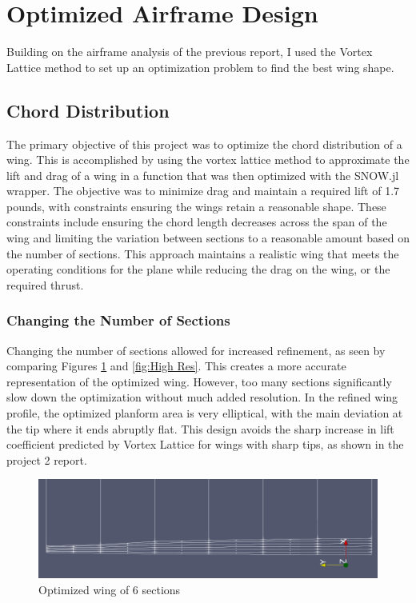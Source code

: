 \documentclass{article}
\begin{document}
\section{Optimized Airframe Design}
Building on the airframe analysis of the previous report, I used the Vortex Lattice method to set up an optimization problem to find the best wing shape.

\subsection{Chord Distribution}
The primary objective of this project was to optimize the chord distribution of a wing. This is accomplished by using the vortex lattice method to approximate the lift and drag of a wing in a function that was then optimized with the SNOW.jl wrapper. The objective was to minimize drag and maintain a required lift of 1.7 pounds, with constraints ensuring the wings retain a reasonable shape. These constraints include ensuring the chord length decreases across the span of the wing and limiting the variation between sections to a reasonable amount based on the number of sections. This approach maintains a realistic wing that meets the operating conditions for the plane while reducing the drag on the wing, or the required thrust.

\subsubsection{Changing the Number of Sections}
Changing the number of sections allowed for increased refinement, as seen by comparing Figures \ref{fig:Low Res} and \ref{fig:High Res}. This creates a more accurate representation of the optimized wing. However, too many sections significantly slow down the optimization without much added resolution. In the refined wing profile, the optimized planform area is very elliptical, with the main deviation at the tip where it ends abruptly flat. This design avoids the sharp increase in lift coefficient predicted by Vortex Lattice for wings with sharp tips, as shown in the project 2 report.

\begin{figure}[h]
\centering
\includegraphics[width=\textwidth]{LOW RES FOCUSED.png}
\caption{Optimized wing of 6 sections}
\label{fig:Low Res}
\end{figure}
\end{document}
